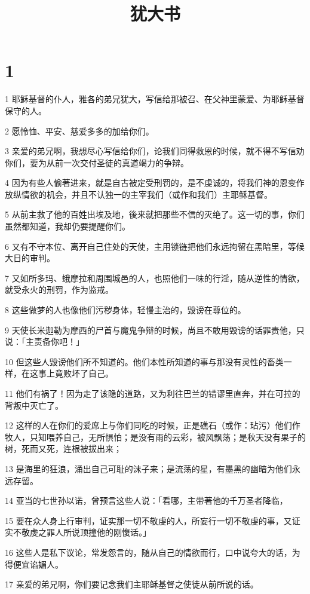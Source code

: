 

\title{犹大书}


\chapter{1}

\par 1 耶稣基督的仆人，雅各的弟兄犹大，写信给那被召、在父神里蒙爱、为耶稣基督保守的人。
\par 2 愿怜恤、平安、慈爱多多的加给你们。
\par 3 亲爱的弟兄啊，我想尽心写信给你们，论我们同得救恩的时候，就不得不写信劝你们，要为从前一次交付圣徒的真道竭力的争辩。
\par 4 因为有些人偷著进来，就是自古被定受刑罚的，是不虔诚的，将我们神的恩变作放纵情欲的机会，并且不认独一的主宰我们（或作和我们）主耶稣基督。
\par 5 从前主救了他的百姓出埃及地，後来就把那些不信的灭绝了。这一切的事，你们虽然都知道，我却仍要提醒你们。
\par 6 又有不守本位、离开自己住处的天使，主用锁链把他们永远拘留在黑暗里，等候大日的审判。
\par 7 又如所多玛、蛾摩拉和周围城邑的人，也照他们一味的行淫，随从逆性的情欲，就受永火的刑罚，作为监戒。
\par 8 这些做梦的人也像他们污秽身体，轻慢主治的，毁谤在尊位的。
\par 9 天使长米迦勒为摩西的尸首与魔鬼争辩的时候，尚且不敢用毁谤的话罪责他，只说：「主责备你吧！」
\par 10 但这些人毁谤他们所不知道的。他们本性所知道的事与那没有灵性的畜类一样，在这事上竟败坏了自己。
\par 11 他们有祸了！因为走了该隐的道路，又为利往巴兰的错谬里直奔，并在可拉的背叛中灭亡了。
\par 12 这样的人在你们的爱席上与你们同吃的时候，正是礁石（或作：玷污）他们作牧人，只知喂养自己，无所惧怕；是没有雨的云彩，被风飘荡；是秋天没有果子的树，死而又死，连根被拔出来；
\par 13 是海里的狂浪，涌出自己可耻的沫子来；是流荡的星，有墨黑的幽暗为他们永远存留。
\par 14 亚当的七世孙以诺，曾预言这些人说：「看哪，主带著他的千万圣者降临，
\par 15 要在众人身上行审判，证实那一切不敬虔的人，所妄行一切不敬虔的事，又证实不敬虔之罪人所说顶撞他的刚愎话。」
\par 16 这些人是私下议论，常发怨言的，随从自己的情欲而行，口中说夸大的话，为得便宜谄媚人。
\par 17 亲爱的弟兄啊，你们要记念我们主耶稣基督之使徒从前所说的话。
